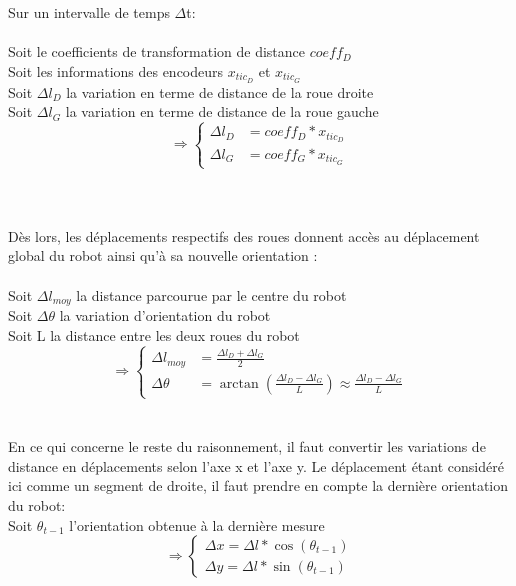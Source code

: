 \documentclass[a4paper,11pt]{article}
\begin{document}
Sur un intervalle de temps $\Delta$t:\\ \\
Soit le coefficients de transformation de distance $coeff_{D}$\\ 
Soit les informations des encodeurs $x_{tic_{D}}$ et $x_{tic_{G}}$\\
Soit $\Delta l_{D}$ la variation en terme de distance de la roue droite\\
Soit $\Delta l_{G}$ la variation en terme de distance de la roue gauche\\


\begin{equation*}
    \Rightarrow\left\{
      \begin{aligned}
        \Delta l_{D} & = coeff_{D}*x_{tic_{D}}\\
        \Delta l_{G} & = coeff_{G}*x_{tic_{G}}
        \end{aligned}
    \right.
\end{equation*}\\\\\\
Dès lors, les déplacements respectifs des roues donnent accès au déplacement global du robot ainsi qu'à sa nouvelle orientation :\\\\
Soit $\Delta l_{moy}$ la distance parcourue par le centre du robot\\
Soit $\Delta\theta$ la variation d'orientation du robot\\
Soit L la distance entre les deux roues du robot
\begin{equation*}
    \Rightarrow\left\{
      \begin{aligned}
        \Delta l_{moy}  & =\frac{\Delta l_{D}+\Delta l_{G}}{2}\\
        \Delta\theta  & = \arctan(\frac{\Delta l_{D}-\Delta l_{G}}{L}) \approx \frac{\Delta l_{D}-\Delta l_{G}}{L}
        \end{aligned}
    \right.
\end{equation*}\\\\
En ce qui concerne le reste du raisonnement, il faut convertir les variations de distance en déplacements selon l'axe x et l'axe y. Le déplacement étant considéré ici comme un segment de droite, il faut prendre en compte la dernière orientation du robot\cite{noauthor_robotics:odometrie_2014}:\\
Soit $\theta_{t-1}$ l'orientation obtenue à la dernière mesure
\begin{equation*}
    \Rightarrow\left\{
      \begin{aligned}
        \Delta x = \Delta l*\cos(\theta_{t-1})\\
        \Delta y = \Delta l*\sin(\theta_{t-1})
        \end{aligned}
    \right.
\end{equation*}\\\\
\end{document}
